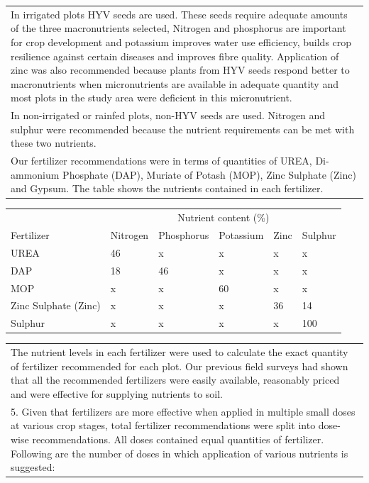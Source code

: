 \documentclass{article}
\begin{document}
\begin{table}[!htb]
\begin{tabularx}{\linewidth}{X}
In irrigated plots HYV seeds are used. These seeds require adequate amounts of the three macronutrients selected, Nitrogen and phosphorus are important for crop development and potassium improves water use efficiency, builds crop resilience against certain diseases and improves fibre quality. Application of zinc was also recommended because plants from HYV seeds respond better to macronutrients when micronutrients are available in adequate quantity and most plots in the study area were deficient in this micronutrient. \\
In non-irrigated or rainfed plots, non-HYV seeds are used.  Nitrogen and sulphur were recommended because the nutrient requirements can be met with these two nutrients.\\
Our fertilizer recommendations were in terms of quantities of UREA, Di-ammonium Phosphate (DAP), Muriate of Potash (MOP), Zinc Sulphate (Zinc) and Gypsum. The table shows the nutrients contained in each fertilizer. \\ \hline 
\end{tabularx}
\begin{tabularx}{\linewidth}{lXXXXX}
 & \multicolumn{5}{c}{Nutrient content (\%)} \\
\cmidrule(l{2pt}r{2pt}){2-6} 
Fertilizer & Nitrogen & Phosphorus & Potassium & Zinc & Sulphur \\
UREA & 46 & x & x & x & x \\
DAP & 18 & 46 & x & x & x \\
MOP & x & x & 60 & x & x \\
Zinc Sulphate (Zinc) & x & x & x & 36 & 14 \\
Sulphur & x & x & x & x & 100\\
\end{tabularx}
\begin{tabularx}{\linewidth}{X}
\hline 
The nutrient levels in each fertilizer were used to calculate the exact quantity of fertilizer recommended for each plot. Our previous field surveys had shown that all the recommended fertilizers were easily available, reasonably priced and were effective for supplying nutrients to soil. \\
5. Given that fertilizers are more effective when applied in multiple small doses at various crop stages, total fertilizer recommendations were split into dose-wise recommendations. All doses contained equal quantities of fertilizer.  Following are the number of doses in which application of various nutrients is suggested: \\ \hline

\end{tabularx}
\end{table}
\end{document}
